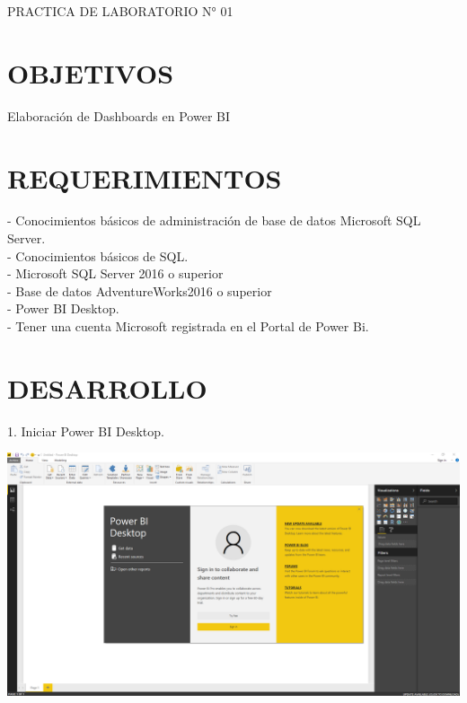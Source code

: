 \begin{center}
    PRACTICA DE LABORATORIO N° 01
\end{center}

\section{OBJETIVOS}
Elaboración de Dashboards en Power BI

\section{REQUERIMIENTOS}

\begin{itemize}

- Conocimientos básicos de administración de base de datos Microsoft   SQL Server.
\\- Conocimientos básicos de SQL.
\\- Microsoft SQL Server 2016 o superior
\\- Base de datos AdventureWorks2016 o superior
\\- Power BI Desktop.
\\- Tener una cuenta Microsoft registrada en el Portal de Power Bi.
\end{itemize}

\section{DESARROLLO} 

\begin{itemize}
1. Iniciar Power BI Desktop.
\end{itemize} 

\begin{center}
\includegraphics[width=15cm]{./Imagenes/imagen1} 
\end{center}

